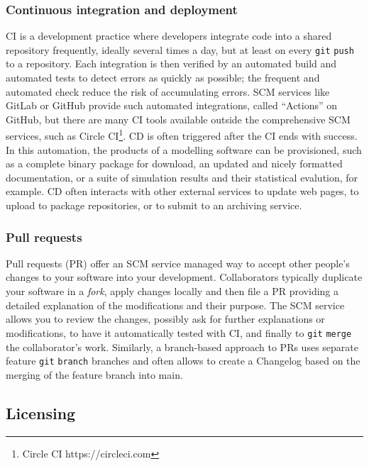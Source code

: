 \documentclass[preprint,11pt,5p]{elsarticle}
\begin{document}
\subsubsection{Continuous integration and
deployment}\label{continuous-integration-and-deployment}

CI is a development practice where developers integrate code into a
shared repository frequently, ideally several times a day, but at least
on every \texttt{git} \texttt{push} to a repository. Each integration is
then verified by an automated build and automated tests to detect errors
as quickly as possible; the frequent and automated check reduce the risk
of accumulating errors. SCM services like GitLab or GitHub provide such
automated integrations, called ``Actions'' on GitHub, but there are many
CI tools available outside the comprehensive SCM services, such as
Circle CI\footnote{Circle CI https://circleci.com}. CD is often
triggered after the CI ends with success. In this automation, the
products of a modelling software can be provisioned, such as a complete
binary package for download, an updated and nicely formatted
documentation, or a suite of simulation results and their statistical
evalution, for example. CD often interacts with other external services
to update web pages, to upload to package repositories, or to submit to
an archiving service.

\subsubsection{Pull requests}\label{pull-requests}

Pull requests (PR) offer an SCM service managed way to accept other
people's changes to your software into your development. Collaborators
typically duplicate your software in a \emph{fork}, apply changes
locally and then file a PR providing a detailed explanation of the
modifications and their purpose. The SCM service allows you to review
the changes, possibly ask for further explanations or modifications, to
have it automatically tested with CI, and finally to \texttt{git}
\texttt{merge} the collaborator's work. Similarly, a branch-based
approach to PRs uses separate feature \texttt{git} \texttt{branch}
branches and often allows to create a Changelog based on the merging of
the feature branch into main.

\subsection{Licensing}\label{licensing}
\end{document}
